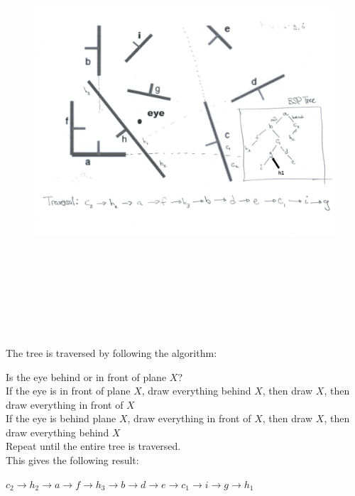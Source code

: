 \documentclass[a4paper,10pt]{scrartcl}
\begin{document}
\begin{figure}[H]
  \centering
  \includegraphics[trim = 2cm 4.5cm 1cm 0, clip, width=\linewidth, height=15cm]{q4.png}
\end{figure}




\subsection{}

The tree is traversed by following the algorithm:

Is the eye behind or in front of plane $X$? \\
If the eye is in front of plane $X$, draw everything behind $X$, then draw $X$, then draw everything in front of $X$\\
If the eye is behind plane $X$, draw everything in front of $X$, then draw $X$, then draw everything behind $X$ \\

Repeat until the entire tree is traversed. \\

This gives the following result:

$c_2 \to h_2 \to a \to f \to h_3 \to b \to d \to e \to c_1 \to i \to g \to h_1$
\end{document}
